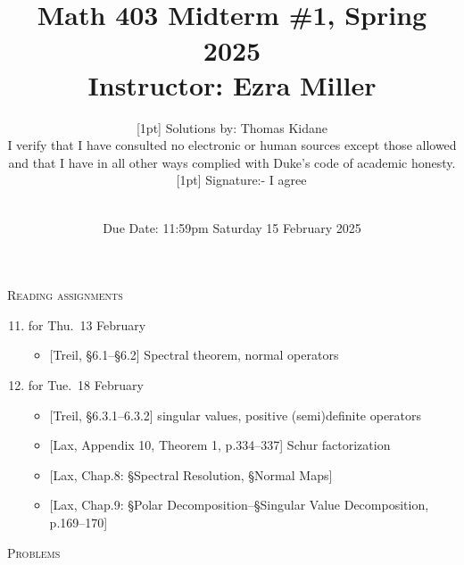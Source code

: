 \documentclass[11pt]{article}
\newcommand\total[2]{\marginpar{\colorbox{yellow}{\huge #1/#2}}}
\newcommand\0{\mathbf{0}}
\newcommand\<{\langle}
\renewcommand\>{\rangle}
\begin{document}


\title{\mbox{}\\[-11.4ex]Math 403 Midterm \#1, Spring 2025\\\normalsize
	Instructor: Ezra Miller\\[-2.5ex]}
\author{[1pt] Solutions by: Thomas Kidane\\[1ex]
I verify that I have consulted no electronic or human sources except
those allowed\\
and that I have in all other ways complied with Duke's code of
academic honesty.\hfill\mbox{}\\[.5ex]
\ \ \ [1pt] Signature:- I agree}
\date{\mbox{}\\[-2.6ex]Due Date: 11:59pm Saturday 15 February 2025}

\maketitle
\thispagestyle{empty}%

\vspace{-5ex}%
\noindent
\textsc{Reading assignments}\total{71}{100}%
\begin{enumerate}[itemsep=-1ex]\setcounter{enumi}{10}
\item%
for Thu.~13 February
  \begin{itemize}
  \item{}%
  [Treil, \S 6.1--\S 6.2] Spectral theorem, normal operators
  \end{itemize}

\item%
for Tue.~18 February
  \begin{itemize}
  \item{}%
  [Treil, \S 6.3.1--6.3.2] singular values, positive (semi)definite operators
  \item{}%
  [Lax, Appendix 10, Theorem 1, p.334--337] Schur factorization
  \item{}%
  [Lax, Chap.8: \S Spectral Resolution, \S Normal Maps]
  \item{}%
  [Lax, Chap.9: \S Polar Decomposition--\S Singular Value
  Decomposition, p.169--170]
  \end{itemize}
\end{enumerate}

\noindent
\textsc{Problems}
\end{document}
